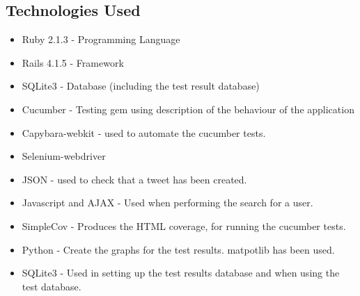 \documentclass[10pt,a4paper,titlepage]{article}
\begin{document}
\subsection{Technologies Used}
\begin{itemize}
\item Ruby 2.1.3 - Programming Language
\item Rails 4.1.5 - Framework
\item SQLite3 - Database (including the test result database)
\item Cucumber - Testing gem using description of the behaviour of the application
\item Capybara-webkit - used to automate the cucumber tests.
\item Selenium-webdriver
\item JSON - used to check that a tweet has been created.
\item Javascript and AJAX - Used when performing the search for a user.
\item SimpleCov - Produces the HTML coverage, for running the cucumber tests.
\item Python - Create the graphs for the test results. matpotlib has been used.
\item SQLite3 - Used in setting up the test results database and when using the test database.
\end{itemize}
\end{document}

